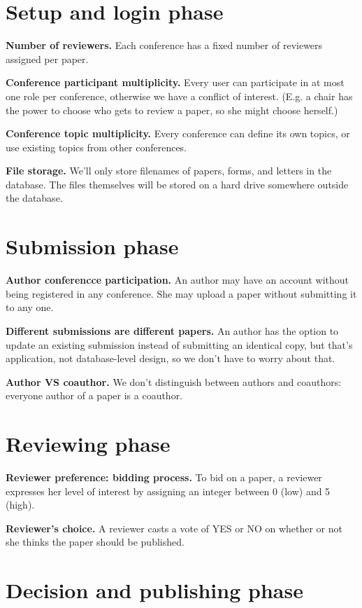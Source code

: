 \documentclass[12pt]{article}
\renewcommand{\bf}{\bfseries}
\newcommand{\<}{\langle}
\renewcommand{\>}{\rangle}
\begin{document}
\section{Setup and login phase}

{\bf Number of reviewers.} Each conference has a fixed number of reviewers assigned per paper.

{\bf Conference participant multiplicity.} Every user can participate in at most one role per conference, otherwise we have a conflict of interest. (E.g. a chair has the power to choose who gets to review a paper, so she might choose herself.)

{\bf Conference topic multiplicity.} Every conference can define its own topics, or use existing topics from other conferences.

{\bf File storage.} We'll only store filenames of papers, forms, and letters in the database. The files themselves will be stored on a hard drive somewhere outside the database.

\section{Submission phase}

{\bf Author conferencce participation.} An author may have an account without being registered in any conference. She may upload a paper without submitting it to any one.

{\bf Different submissions are different papers.} An author has the option to update an existing submission instead of submitting an identical copy, but that's application, not database-level design, so we don't have to worry about that.

{\bf Author VS coauthor.} We don't distinguish between authors and coauthors: everyone author of a paper is a coauthor.

\section{Reviewing phase}

{\bf Reviewer preference: bidding process.} To bid on a paper, a reviewer expresses her level of interest by assigning an integer between 0 (low) and 5 (high). 

{\bf Reviewer's choice.} A reviewer casts a vote of YES or NO on whether or not she thinks the paper should be published.

\section{Decision and publishing phase}
\end{document}
